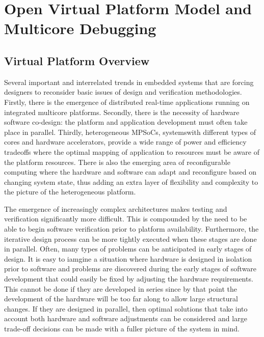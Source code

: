 
\chapter{Open Virtual Platform Model and Multicore Debugging} %

\label{Chapter4} %


\section{Virtual Platform Overview}
Several important and interrelated trends in embedded systems that are forcing designers to reconsider basic issues of design and verification methodologies. Firstly, there is the emergence of distributed real-time applications running on integrated multicore platforms. Secondly, there is the necessity of hardware software co-design: the platform and application development must often take place in parallel. Thirdly, heterogeneous MPSoCs, systemswith different types of cores and hardware accelerators, provide a wide range of power and efficiency tradeoffs where the optimal mapping of application to resources must be aware of the platform resources. There is also the emerging area of reconfigurable computing where the hardware and software can adapt and reconfigure based on changing system state, thus adding an extra layer of flexibility and complexity to the picture of the heterogeneous platform.

The emergence of increasingly complex architectures makes testing and verification significantly more difficult. This is compounded by the need to be able to begin software verification prior to platform availability. Furthermore, the iterative design process can be more tightly executed when these stages are done in parallel. Often, many types of problems can be anticipated in early stages of design. It is easy to iamgine a situation where hardware is designed in isolation prior to software and problems are discovered during the early stages of software development that could easily be fixed by adjusting the hardware requirements. This cannot be done if they are developed in series since by that point the development of the hardware will be too far along to allow large structural changes. If they are designed in parallel, then optimal solutions that take into account both hardware and software adjustments can be considered and large trade-off decisions can be made with a fuller picture of the system in mind.


